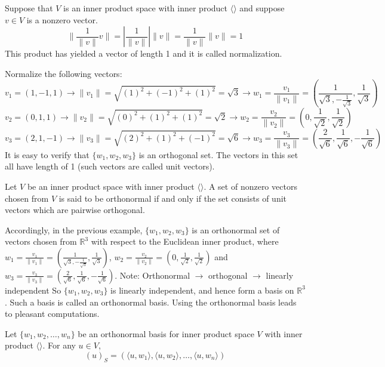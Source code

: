 \documentclass[12pt]{article}
\begin{document}
\begin{definition} Suppose that $V$ is an inner product space with inner product $\langle \rangle$ and suppose $v \in V$ is a nonzero vector. $$\|\frac{1}{\|v\|}v\| = |\frac{1}{\|v\|}|\|v\| = \frac{1}{\|v\|}\|v\| = 1$$ This product has yielded a vector of length 1 and it is called normalization. \end{definition} 
\begin{example} Normalize the following vectors: $$v_1 = (1, -1, 1) \rightarrow \|v_1\| = \sqrt{(1)^2 + (-1)^2 + (1)^2} = \sqrt{3} \rightarrow w_1 = \frac{v_1}{\|v_1\|} = (\frac{1}{\sqrt{3}, -\frac{1}{\sqrt{3}}}, \frac{1}{\sqrt{3}}) $$ $$v_2 = (0, 1, 1) \rightarrow \|v_2\| = \sqrt{(0)^2 + (1)^2 + (1)^2} = \sqrt{2} \rightarrow w_2 = \frac{v_2}{\|v_2\|} = (0, \frac{1}{\sqrt{2}}, \frac{1}{\sqrt{2}}) $$ $$v_3 = (2, 1, -1) \rightarrow \|v_3\| = \sqrt{(2)^2 + (1)^2 + (-1)^2} = \sqrt{6} \rightarrow w_3 = \frac{v_3}{\|v_3\|} = (\frac{2}{\sqrt{6}}, \frac{1}{\sqrt{6}}, -\frac{1}{\sqrt{6}}) $$ It is easy to verify that $\{w_1, w_2, w_3\}$ is an orthogonal set. The vectors in this set all have length of 1 (such vectors are called unit vectors). \end{example} 
\begin{definition} Let $V$ be an inner product space with inner product $\langle \rangle$. A set of nonzero vectors chosen from $V$ is said to be orthonormal if and only if the set consists of unit vectors which are pairwise orthogonal. \end{definition} 
Accordingly, in the previous example, $\{w_1, w_2, w_3\}$ is an orthonormal set of vectors chosen from $\mathbb{R}^3$ with respect to the Euclidean inner product, where 
$w_1 = \frac{v_1}{\|v_1\|} = (\frac{1}{\sqrt{3}, -\frac{1}{\sqrt{3}}}, \frac{1}{\sqrt{3}})$, $w_2 = \frac{v_2}{\|v_2\|} = (0, \frac{1}{\sqrt{2}}, \frac{1}{\sqrt{2}})$ and $w_3 = \frac{v_3}{\|v_3\|} = (\frac{2}{\sqrt{6}}, \frac{1}{\sqrt{6}}, -\frac{1}{\sqrt{6}})$. \newline
Note: Orthonormal $\rightarrow$ orthogonal $\rightarrow$ linearly independent \newline 
So $\{w_1, w_2, w_3\}$ is linearly independent, and hence form a basis on $\mathbb{R}^3$. Such a basis is called an orthonormal basis. \newline 
Using the orthonormal basis leads to pleasant computations. 
\begin{theorem} Let $\{w_1, w_2, \dots, w_n\}$ be an orthonormal basis for inner product space $V$ with inner product $\langle \rangle$. For any $u \in V$, $$(u)_S = (\langle u, w_1\rangle, \langle u, w_2 \rangle, \dots, \langle u, w_n \rangle) $$ \end{theorem} 
\end{document}

